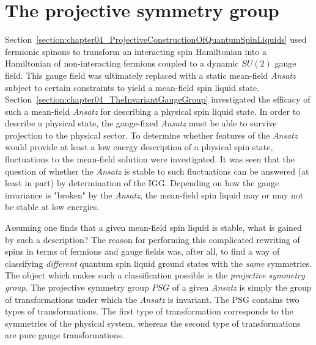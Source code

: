%
\section{The projective symmetry group}
\label{section:chapter04_TheProjectiveSymmetryGroup}
%
Section~\ref{section:chapter04_ProjectiveConstructionOfQuantumSpinLiquids} used fermionic spinons to transform an interacting spin Hamiltonian into a Hamiltonian of non-interacting fermions coupled to a dynamic $SU(2)$ gauge field.
This gauge field was ultimately replaced with a static mean-field \textit{Ansatz} subject to certain constraints to yield a mean-field spin liquid state.
Section~\ref{section:chapter04_TheInvariantGaugeGroup} investigated the efficacy of such a mean-field \textit{Ansatz} for describing a physical spin liquid state.
In order to describe a physical state, the gauge-fixed \textit{Ansatz} must be able to survive projection to the physical sector.
To determine whether features of the \textit{Ansatz} would provide at least a low energy description of a physical spin state, fluctuations to the mean-field solution were investigated.
It was seen that the question of whether the \textit{Ansatz} is stable to such fluctuations can be answered (at least in part) by determination of the IGG.
Depending on how the gauge invariance is "broken" by the \textit{Ansatz}, the mean-field spin liquid may or may not be stable at low energies.

Assuming one finds that a given mean-field spin liquid is stable, what is gained by such a description?
The reason for performing this complicated rewriting of spins in terms of fermions and gauge fields was, after all, to find a way of classifying \textit{different} quantum spin liquid ground states with the \textit{same} symmetries.
The object which makes such a classification possible is the \textit{projective symmetry group}.
The projective symmetry group $PSG$ of a given \textit{Ansatz} is simply the group of transformations under which the \textit{Ansatz} is invariant.
The PSG contains two types of transformations.
The first type of transformation corresponds to the symmetries of the physical system, whereas the second type of transformations are pure gauge transformations.

